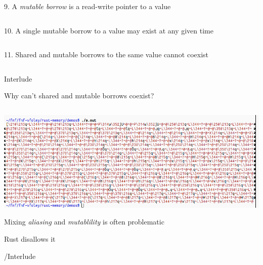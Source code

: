 \documentclass[9pt]{beamer}
\renewcommand\big[1]{
  \begin{center}
    \Large{#1}
  \end{center}
}
\begin{document}
\begin{frame}
  \big{9. A \emph{mutable borrow} is a read-write pointer to a value}
\end{frame}

\begin{frame}[fragile]
  \inputminted{rust}{demos/07_mut_borrow.rs}
\end{frame}

\begin{frame}
  \big{10. A single mutable borrow to a value may exist at any given time}
\end{frame}

\begin{frame}[fragile]
  \inputminted{rust}{demos/08_single_mut_borrow.rs}
\end{frame}

\begin{frame}
  \big{11. Shared and mutable borrows to the same value cannot coexist}
\end{frame}

\begin{frame}[fragile]
  \inputminted{rust}{demos/09_mutex_borrows.rs}
\end{frame}

\begin{frame}
  \centering\Huge{Interlude}

  \big{Why can't shared and mutable borrows coexist?}
\end{frame}

\begin{frame}[fragile]
  \inputminted{c++}{demos/interlude.cpp}
\end{frame}

\begin{frame}
  \centering\includegraphics[scale=0.32]{demos/boom.png}
\end{frame}

\begin{frame}
  \big{Mixing \emph{aliasing} and \emph{mutablility} is often problematic}

  \big{Rust disallows it}

  \centering\Huge{/Interlude}
\end{frame}
\end{document}
